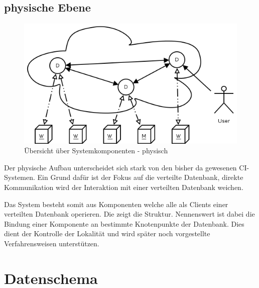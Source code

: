 

\subsection{physische Ebene}

\begin{figure}[ht] 
  \centering
  \includegraphics[width=\textwidth]{imageinput/grob-layout-komponenten.png}
  \caption{Übersicht über Systemkomponenten - physisch}
  \label{fig:grob-layout-komponenten}
\end{figure}

Der physische Aufbau unterscheidet sich stark von den bisher da gewesenen CI-Systemen.
Ein Grund dafür ist der Fokus auf die verteilte Datenbank, direkte Kommunikation
wird der Interaktion mit einer verteilten Datenbank weichen.

Das System besteht somit aus Komponenten welche alle als Clients einer verteilten Datenbank operieren.
Die  zeigt die Struktur.
Nennenswert ist dabei die Bindung einer Komponente an bestimmte Knotenpunkte der Datenbank. Dies dient der Kontrolle der Lokalität und wird später noch vorgestellte Verfahrensweisen unterstützen.


\section{Datenschema}


